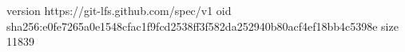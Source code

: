 version https://git-lfs.github.com/spec/v1
oid sha256:e0fe7265a0e1548cfac1f9fcd2538ff3f582da252940b80acf4ef18bb4c5398e
size 11839
